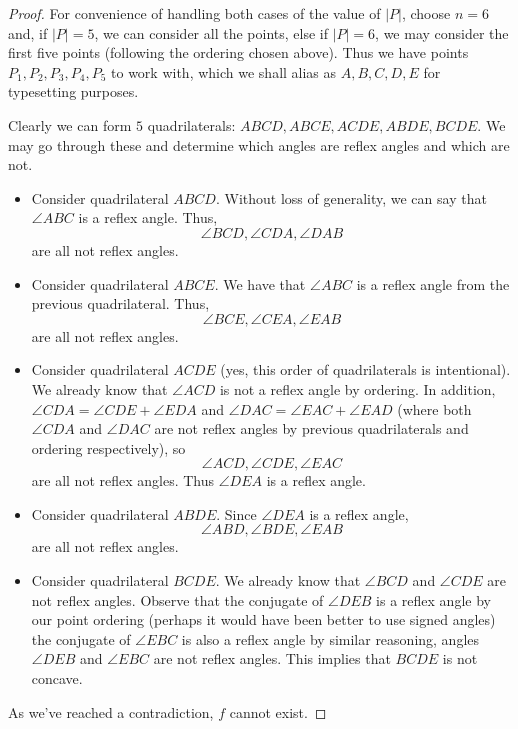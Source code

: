 \begin{solution}{4}
\begin{enumerate}[label=\alph*)]
\begin{proof}
            For convenience of handling both cases of the value of \( |P| \),
            choose \( n = 6 \) and, if \( |P| = 5 \), we can consider all the
            points, else if \( |P| = 6 \), we may consider the first five
            points (following the ordering chosen above). Thus we have points
            \( P_1, P_2, P_3, P_4, P_5 \) to work with, which we shall alias as
            \( A, B, C, D, E \) for typesetting purposes.

            Clearly we can form \( 5 \) quadrilaterals: \( ABCD, ABCE, ACDE,
            ABDE, BCDE \). We may go through these and determine which angles
            are reflex angles and which are not.
            \begin{itemize}
                \item Consider quadrilateral \( ABCD \). Without loss of generality, we can say that \( \angle ABC \) is a reflex angle. Thus,
                    \[
                        \angle BCD, \angle CDA, \angle DAB
                    \]
                    are all not reflex angles.
                \item Consider quadrilateral \( ABCE \). We have that \( \angle ABC \) is a reflex angle from the previous quadrilateral. Thus,
                    \[
                        \angle BCE, \angle CEA, \angle EAB
                    \]
                    are all not reflex angles.
                \item Consider quadrilateral \( ACDE \) (yes, this order of quadrilaterals is intentional). We already know that \( \angle ACD \) is not a reflex angle by ordering. In addition, \( \angle CDA = \angle CDE + \angle EDA \) and \( \angle DAC = \angle EAC + \angle EAD \) (where both \( \angle CDA \) and \( \angle DAC \) are not reflex angles by previous quadrilaterals and ordering respectively), so
                    \[
                        \angle ACD, \angle CDE, \angle EAC
                    \]
                    are all not reflex angles. Thus \( \angle DEA \) is a reflex angle.
                \item Consider quadrilateral \( ABDE \). Since \( \angle DEA \) is a reflex angle,
                    \[
                        \angle ABD, \angle BDE, \angle EAB
                    \]
                    are all not reflex angles.
                \item Consider quadrilateral \( BCDE \). We already know that \( \angle BCD \) and \(  \angle CDE \) are not reflex angles. Observe that the conjugate of \( \angle DEB \) is a reflex angle by our point ordering (perhaps it would have been better to use signed angles) the conjugate of \( \angle EBC \) is also a reflex angle by similar reasoning, angles \( \angle DEB \) and \( \angle EBC \) are not reflex angles. This implies that \( BCDE \) is not concave.
            \end{itemize}
            As we've reached a contradiction, \( f \) cannot exist.
        \end{proof}
    \end{enumerate}
\end{solution}
